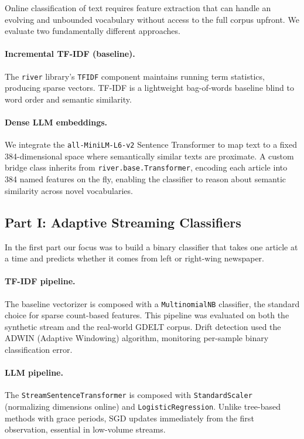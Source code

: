 \documentclass[
	a4paper,
	10pt,
	unnumberedsections,
	twoside,
]{LTJournalArticle}
\begin{document}
Online classification of text requires feature extraction that can handle an evolving and unbounded vocabulary without access to the full corpus upfront. We evaluate two fundamentally different approaches.

\paragraph{Incremental TF-IDF (baseline).}
The \texttt{river} library's \texttt{TFIDF} component maintains running term statistics, producing sparse vectors. TF-IDF is a lightweight bag-of-words baseline blind to word order and semantic similarity.

\paragraph{Dense LLM embeddings.}
We integrate the \texttt{all-MiniLM-L6-v2} Sentence Transformer \cite{wang2020minilm} to map text to a fixed 384-dimensional space where semantically similar texts are proximate. A custom bridge class inherits from \texttt{river.base.Transformer}, encoding each article into 384 named features on the fly, enabling the classifier to reason about semantic similarity across novel vocabularies.

\subsection{Part I: Adaptive Streaming Classifiers}
In the first part our focus was to build a binary classifier that takes one article at a time and predicts whether it comes from left or right-wing newspaper.
\paragraph{TF-IDF pipeline.}
The baseline vectorizer is composed with a \texttt{MultinomialNB} classifier, the standard choice for sparse count-based features. This pipeline was evaluated on both the synthetic stream and the real-world GDELT corpus. Drift detection used the ADWIN (Adaptive Windowing) algorithm, monitoring per-sample binary classification error.

\paragraph{LLM pipeline.}
The \texttt{StreamSentenceTransformer} is composed with \texttt{StandardScaler} (normalizing dimensions online) and \texttt{LogisticRegression}. Unlike tree-based methods with grace periods, SGD updates immediately from the first observation, essential in low-volume streams.
\end{document}
